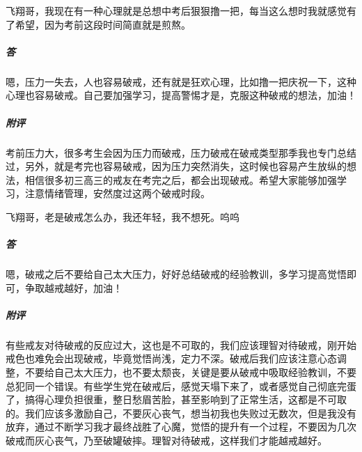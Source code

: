 \begin{case}
    飞翔哥，我现在有一种心理就是总想中考后狠狠撸一把，每当这么想时我就感觉有了希望，因为考前这段时间简直就是煎熬。
    \subparagraph{答} 嗯，压力一失去，人也容易破戒，还有就是狂欢心理，比如撸一把庆祝一下，这种心理也容易破戒。自己要加强学习，提高警惕才是，克服这种破戒的想法，加油！
    \subparagraph{附评} 考前压力大，很多考生会因为压力而破戒，压力破戒在破戒类型那季我也专门总结过，另外，就是考完也容易破戒，因为压力突然消失，这时候也容易产生放纵的想法，相信很多初三高三的戒友在考完之后，都会出现破戒。希望大家能够加强学习，注意情绪管理，安然度过这两个破戒时段。
\end{case}

\begin{case}
    飞翔哥，老是破戒怎么办，我还年轻，我不想死。呜呜
    \subparagraph{答} 嗯，破戒之后不要给自己太大压力，好好总结破戒的经验教训，多学习提高觉悟即可，争取越戒越好，加油！
    \subparagraph{附评} 有些戒友对待破戒的反应过大，这也是不可取的，我们应该理智对待破戒，刚开始戒色也难免会出现破戒，毕竟觉悟尚浅，定力不深。破戒后我们应该注意心态调整，不要给自己太大压力，也不要太颓丧，关键是要从破戒中吸取经验教训，不要总犯同一个错误。有些学生党在破戒后，感觉天塌下来了，或者感觉自己彻底完蛋了，搞得心理负担很重，整日愁眉苦脸，甚至影响到了正常生活，这都是不可取的。我们应该多激励自己，不要灰心丧气，想当初我也失败过无数次，但是我没有放弃，通过不断学习我才最终战胜了心魔，觉悟的提升有一个过程，不要因为几次破戒而灰心丧气，乃至破罐破摔。理智对待破戒，这样我们才能越戒越好。
\end{case}

